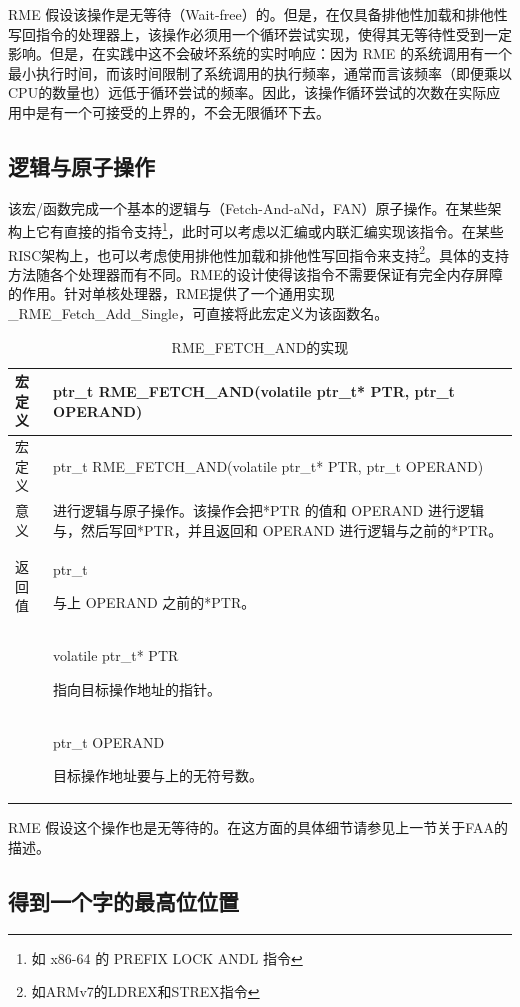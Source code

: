 RME 假设该操作是无等待（Wait-free）的。但是，在仅具备排他性加载和排他性写回指令的处理器上，该操作必须用一个循环尝试实现，使得其无等待性受到一定影响。但是，在实践中这不会破坏系统的实时响应：因为 RME 的系统调用有一个最小执行时间，而该时间限制了系统调用的执行频率，通常而言该频率（即便乘以CPU的数量也）远低于循环尝试的频率。因此，该操作循环尝试的次数在实际应用中是有一个可接受的上界的，不会无限循环下去。

\subsection{逻辑与原子操作}\label{subsec:7-logical-and-atomic-operation}

该宏/函数完成一个基本的逻辑与（Fetch-And-aNd，FAN）原子操作。在某些架构上它有直接的指令支持\footnote{如 x86-64 的 PREFIX LOCK ANDL 指令}，此时可以考虑以汇编或内联汇编实现该指令。在某些RISC架构上，也可以考虑使用排他性加载和排他性写回指令来支持\footnote{如ARMv7的LDREX和STREX指令}。具体的支持方法随各个处理器而有不同。RME的设计使得该指令不需要保证有完全内存屏障的作用。针对单核处理器，RME提供了一个通用实现\_RME\_Fetch\_Add\_Single，可直接将此宏定义为该函数名。

\begin{xltabular}{\textwidth}{@{}>{\hsize\raggedright\arraybackslash}X>{\hsize\raggedright\arraybackslash}X@{}}
\caption{RME\_FETCH\_AND的实现}\label{tab:7-33-rme-fetch-and-implementation}\\
\toprule
宏定义 & ptr\_t RME\_FETCH\_AND(volatile ptr\_t* PTR, ptr\_t
OPERAND)\tabularnewline
\endfirsthead
\toprule
宏定义 & ptr\_t RME\_FETCH\_AND(volatile ptr\_t* PTR, ptr\_t
OPERAND)\tabularnewline
\midrule
\endhead
\bottomrule
\endlastfoot
意义 &
进行逻辑与原子操作。该操作会把*PTR 的值和 OPERAND 进行逻辑与，然后写回*PTR，并且返回和 OPERAND 进行逻辑与之前的*PTR。\tabularnewline
返回值\strut
 & ptr\_t

与上 OPERAND 之前的*PTR。\strut
\tabularnewline
{} & volatile ptr\_t* PTR

指向目标操作地址的指针。\strut
\tabularnewline
\strut
 & ptr\_t OPERAND

目标操作地址要与上的无符号数。\strut
\tabularnewline
\end{xltabular}

RME 假设这个操作也是无等待的。在这方面的具体细节请参见上一节关于FAA的描述。

\subsection{得到一个字的最高位位置}\label{subsec:7-get-msb-position-of-word}

